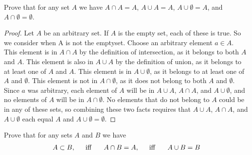             \begin{minorEx}%
            Prove that for any set $A$ we have $ A \cap A = A$, $A \cup A = A$, $A \cup \emptyset = A$, and $A \cap \emptyset = \emptyset$.
            \begin{proof}
            Let $A$ be an arbitrary set. If $A$ is the empty set, each of these is true. So we consider when A is not the emptyset. Choose an arbitrary element $a \in A$. This element is in $A \cap A$ by the definition of intersection, as it belongs to both $A$ and $A$. This element is also in $A \cup A$ by the definition of union, as it belongs to at least one of $A$ and $A$. This element is in $A \cup \emptyset$, as it belongs to at least one of $A$ and $\emptyset$. This element is not in $A \cap \emptyset$, as it does not belong to both $A$ and $\emptyset$. Since $a$ was arbitrary, each element of $A$ will be in $A \cup A$, $A \cap A$, and $A \cup \emptyset$, and no elements of $A$ will be in $A \cap \emptyset$. No elements that do not belong to $A$ could be in any of these sets, so combining these two facts requires that $A \cup A$, $A \cap A$, and $A \cup \emptyset$ each equal $A$ and $A \cup \emptyset = \emptyset$.
            \end{proof}
            \end{minorEx}
            \begin{minorEx}%
				Prove that for any sets $A$ and $B$ we have $$A \subset B, \hspace{15pt} \text{\normalfont iff } \hspace{15pt} A \cap B = A, \hspace{15pt} \text{\normalfont iff } \hspace{15pt} A \cup B = B$$
			\end{minorEx}
